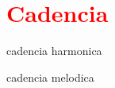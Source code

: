 \section{\textcolor{red}{Cadencia}}

\cite[pp. 249]{latham2008diccionario}
\cite[pp. 111]{holst1998abc}



cadencia harmonica \cite[pp. 67]{melcior1859diccionario} \cite[pp. 60]{pedrell2009diccionario}

cadencia melodica \cite[pp. 66]{melcior1859diccionario} \cite[pp. 60]{pedrell2009diccionario}


